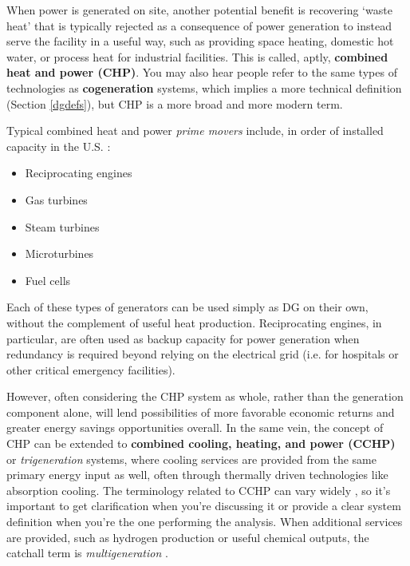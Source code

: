 \documentclass[10pt]{article}
\begin{document}
When power is generated on site, another potential benefit is recovering `waste heat' that is typically rejected as a consequence of power generation to instead serve the facility in a useful way, such as providing space heating, domestic hot water, or process heat for industrial facilities. This is called, aptly, \textbf{combined heat and power (CHP)}. You may also hear people refer to the same types of technologies as \textbf{cogeneration} systems, which implies a more technical definition (Section \ref{dgdefs}), but CHP is a more broad and more modern term.

Typical combined heat and power \textit{prime movers} include, in order of installed capacity in the U.S. \cite{Combined_Heat_and_Power_Partnership2017-rd}:

\vspace{-6pt}
\begin{itemize}
    \setlength{\itemsep}{0pt}%
    \setlength{\parskip}{0pt}%
    \item Reciprocating engines
    \item Gas turbines
    \item Steam turbines
    \item Microturbines
    \item Fuel cells
\end{itemize}
\vspace{-6pt}

Each of these types of generators can be used simply as DG on their own, without the complement of useful heat production. Reciprocating engines, in particular, are often used as backup capacity for power generation when redundancy is required beyond relying on the electrical grid (i.e. for hospitals or other critical emergency facilities). 

However, often considering the CHP system as  whole, rather than the generation component alone, will lend possibilities of more favorable economic returns and greater energy savings opportunities overall. In the same vein, the concept of CHP can be extended to \textbf{combined cooling, heating, and power (CCHP)} or \textit{trigeneration} systems, where cooling services are provided from the same primary energy input as well, often through thermally driven technologies like absorption cooling. The terminology related to CCHP can vary widely \cite{Cho2014-os}, so it's important to get clarification when you're discussing it or provide a clear system definition when you're the one performing the analysis. When additional services are provided, such as hydrogen production or useful chemical outputs, the catchall term is \textit{multigeneration} \cite{Chicco2009-go}.
\end{document}
